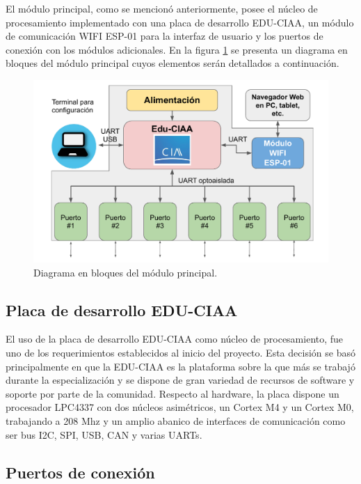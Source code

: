El módulo principal, como se mencionó anteriormente, posee el núcleo de procesamiento implementado con una placa de desarrollo EDU-CIAA, un módulo de comunicación WIFI ESP-01 para la interfaz de usuario y los puertos de conexión con los módulos adicionales. En la figura \ref{fig:BloquesPrincipal} se presenta un diagrama en bloques del módulo principal cuyos elementos serán detallados a continuación.

\begin{figure}[H]
	\centering
	\includegraphics[width=1\textwidth]{./Figures/bloquesPrincipal.pdf}
	\caption{Diagrama en bloques del módulo principal.}
	\label{fig:BloquesPrincipal}
\end{figure}



\subsection{Placa de desarrollo EDU-CIAA}

El uso de la placa de desarrollo EDU-CIAA como núcleo de procesamiento, fue uno de los requerimientos establecidos al inicio del proyecto. Esta decisión se basó principalmente en que la EDU-CIAA es la plataforma sobre la que más se trabajó durante la especialización y se dispone de gran variedad de recursos de software y soporte por parte de la comunidad. 
Respecto al hardware, la placa dispone un procesador LPC4337 con dos núcleos asimétricos, un Cortex M4 y un Cortex M0, trabajando a 208 Mhz y un amplio abanico de interfaces de comunicación como ser bus I2C, SPI, USB, CAN y varias UARTs\citep{EDUCIAA}. 


\subsection{Puertos de conexión}
\label{sec:puertos}

